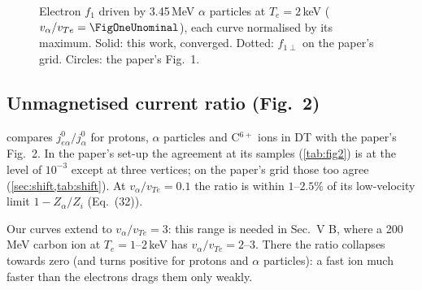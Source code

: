 \documentclass[11pt,a4paper]{article}
\newcommand{\R}{../results}
\newcommand{\D}{data}
\newcommand{\ot}{\omega\tau}
\begin{document}
\begin{figure}[htb]\centering
{}
\caption{Electron $f_1$ driven by 3.45\,MeV $\alpha$ particles at $T_e=2$\,keV ($v_\alpha/v_{Te}=\FigOneUnominal$), each
curve normalised by its maximum. Solid: this work, converged. Dotted: $f_{1\perp}$ on the paper's grid. Circles: the
paper's Fig.~1.}\label{fig:fig1}
\end{figure}

\subsection{Unmagnetised current ratio (Fig.~2)}\label{sec:fig2}
 compares $j^0_{e\alpha}/j^0_\alpha$ for protons, $\alpha$ particles and C$^{6+}$ ions in DT with the
paper's Fig.~2. In the paper's set-up the agreement at its \FigTwoSamples{} samples (\cref{tab:fig2}) is at the level of
$10^{-3}$ except at three vertices; on the paper's grid those too agree (\cref{sec:shift,tab:shift}). At $v_\alpha/v_{Te}=0.1$ the ratio is within
$1$--$2.5\%$ of its low-velocity limit $1-Z_\alpha/Z_i$ (Eq.~(32)).

Our curves extend to $v_\alpha/v_{Te}=3$: this range is needed in Sec.~V B, where a 200\,MeV carbon ion at
$T_e=1$--$2$\,keV has $v_\alpha/v_{Te}=2$--$3$. There the ratio collapses towards zero (and turns positive for protons and
$\alpha$ particles): a fast ion much faster than the electrons drags them only weakly.
\end{document}
